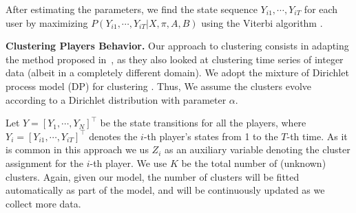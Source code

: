  
After estimating the parameters, we find the state sequence $Y_{i1}, \cdots, Y_{iT}$  
for each user by maximizing $P(Y_{i1}, \cdots, Y_{iT}| X, \pi, A, B)$ using the  Viterbi  algorithm \cite{hmm}. 

{\bf Clustering Players Behavior.}
 Our  approach to clustering consists in  adapting the method proposed in~\cite{moises}, as they also looked at clustering time series of integer data (albeit in a completely different domain). We adopt the mixture of Dirichlet process model (DP) for clustering \cite{dpclustering}.  Thus, We assume the clusters evolve according to a Dirichlet distribution with parameter $\alpha$.

Let $Y = [Y_1, \cdots, Y_N]^\top$ be the state transitions for all the players,
where $Y_i = [Y_{i1}, \cdots, Y_{iT}]^\top$ denotes the $i$-th player's states from 1 to
the $T$-th time. As it is common in this approach we us $Z_i$ as an auxiliary variable denoting the  cluster assignment for the $i$-th player.  We use  $K$ be the total number of (unknown) clusters.  Again, given our model, the number of clusters will be fitted automatically as part of the model, and will be continuously updated as we collect more data. 



